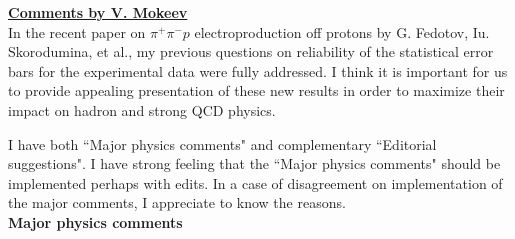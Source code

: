 \documentclass[,superscriptaddress,showpacs,amssymb,amsmath,amsfonts,linenumbers,article]{revtex4-1}
\begin{document}
\begin{itemize}
\begin{enumerate}
\end{enumerate}  


  
\end{itemize}


{\bf \Large \underline{Comments by V. Mokeev}}\\[0.5cm]

In the recent paper on $\pi^+\pi^-p$ electroproduction off protons by  G. Fedotov, Iu. Skorodumina, et al., my previous questions on reliability of the statistical error bars for the experimental data were fully addressed. I think it is important for us to provide appealing presentation of these new results in order to maximize their impact on hadron and strong QCD physics.

 I have both ``Major physics comments" and complementary ``Editorial suggestions". I have strong feeling that the ``Major physics comments" should be implemented perhaps with edits. In a case of disagreement on implementation of the major comments, I appreciate to know the reasons.
\\[0.5cm]

 {\bf \large Major physics comments}\\[1cm]
 
\end{document}
